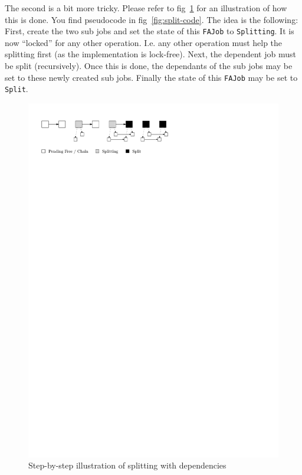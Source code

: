 \documentclass[runningheads,a4paper,fleqn]{llncs}
\begin{document}
The second is a bit more tricky. Please refer to fig~\ref{fig:split-ill}
for an illustration of how this is done. You find pseudocode in
fig~\ref{fig:split-code}. The idea is the following: First, create the
two sub jobs and set the state of this \texttt{FAJob} to
\texttt{Splitting}. It is now ``locked'' for any other operation. I.e. any
other operation must help the splitting first (as the implementation
is lock-free). Next, the dependent job must be split
(recursively). Once this is done, the dependants of the sub jobs may be
set to these newly created sub jobs. Finally the state of this
\texttt{FAJob} may be set to \texttt{Split}.

\begin{figure}
  \centering
  \includegraphics{split}
  \caption{Step-by-step illustration of splitting with dependencies}
  \label{fig:split-ill}
\end{figure}
\end{document}
